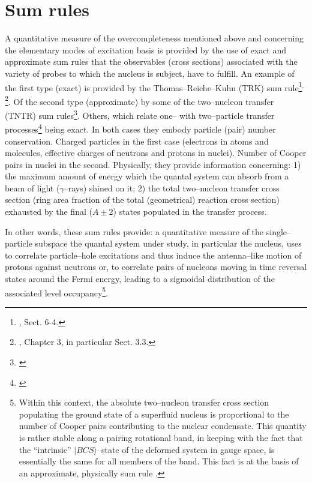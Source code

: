




\section{Sum rules}
A quantitative measure of the overcompleteness mentioned above and concerning the elementary modes of excitation basis is provided by the use of exact and approximate sum rules that the observables (cross sections) associated with the variety of probes to which the nucleus is subject, have to fulfill. An example of the first type (exact) is provided by the Thomas--Reiche--Kuhn (TRK) sum rule\footnote{\cite{Bohr:75}, Sect. 6-4.}$^,$\footnote{\cite{Bertsch:05}, Chapter 3, in particular Sect. 3.3.}. Of the second type (approximate) by some of the two--nucleon transfer (TNTR) sum rules\footnote{\cite{Broglia:72b}}. Others, which relate one-- with two--particle transfer processes\footnote{\cite{Bayman:72,Lanford:77}} being exact. In both cases they embody particle (pair) number conservation. Charged particles in the first case (electrons in atoms and molecules, effective charges of neutrons and protons in nuclei). Number of Cooper pairs in nuclei in the second. Physically, they provide  information concerning: 1) the maximum amount of energy which the quantal system can absorb from a beam of light ($\gamma$--rays) shined on it; 2) the total two--nucleon transfer cross section (ring area fraction of the total (geometrical) reaction cross section) exhausted by the final ($A\pm2$) states populated in the transfer process.


In other words, these sum rules provide: a quantitative measure of the single--particle subspace the quantal system under study, in particular the nucleus, uses to correlate particle--hole excitations and thus induce the antenna--like motion of protons against neutrons or, to correlate pairs of nucleons moving in time reversal states around the Fermi energy, leading to a sigmoidal distribution of the associated level occupancy\footnote{Within this context, the absolute two--nucleon transfer cross section populating the ground state of a superfluid nucleus is proportional to the number of Cooper pairs contributing to the nuclear condensate. This quantity is rather stable along a pairing rotational band, in keeping with the fact that the ``intrinsic'' $|BCS\rangle$--state of the deformed system in gauge space, is essentially the same for all members of the band. This fact is at the basis of an approximate, physically sum rule \cite{Potel:17}.}. 


